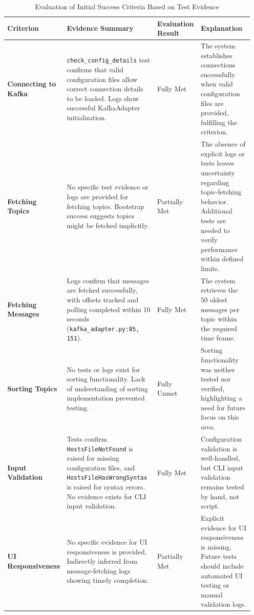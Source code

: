 \documentclass[10pt , a4paper]{report}
\begin{document}
\begin{table}[h!tbp]
\centering
\renewcommand{\arraystretch}{1.3}
\begin{adjustbox}{max width=\textwidth}
\begin{tabular}{|p{3.5cm}|p{5.5cm}|p{3.5cm}|p{3.5cm}|}
\hline
\textbf{Criterion} & \textbf{Evidence Summary} & \textbf{Evaluation Result} & \textbf{Explanation} \\ \hline

\textbf{Connecting to Kafka} & 
\texttt{check\_config\_details} test  confirms that valid configuration files allow correct connection details to be loaded. Logs show successful KafkaAdapter initialization. & 
Fully Met & 
The system establishes connections successfully when valid configuration files are provided, fulfilling the criterion. \\ \hline

\textbf{Fetching Topics} & 
No specific test evidence or logs are provided for fetching topics. Bootstrap success suggests topics might be fetched implicitly. & 
Partially Met & 
The absence of explicit logs or tests leaves uncertainty regarding topic-fetching behavior. Additional tests are needed to verify performance within defined limits. \\ \hline

\textbf{Fetching Messages} & 
Logs confirm that messages are fetched successfully, with offsets tracked and polling completed within 10 seconds (\texttt{kafka\_adapter.py:85, 151}). & 
Fully Met & 
The system retrieves the 50 oldest messages per topic within the required time frame. \\ \hline

\textbf{Sorting Topics} & 
No tests or logs exist for sorting functionality. Lack of understanding of sorting implementation prevented testing. & 
Fully Unmet & 
Sorting functionality was neither tested nor verified, highlighting a need for future focus on this area. \\ \hline

\textbf{Input Validation} & 
Tests confirm \texttt{HostsFileNotFound} is raised for missing configuration files, and \texttt{HostsFileHasWrongSyntax} is raised for syntax errors. No evidence exists for CLI input validation. & 
Fully Met & 
Configuration validation is well-handled, but CLI input validation remains tested by hand, not script. \\ \hline

\textbf{UI Responsiveness} & 
No specific evidence for UI responsiveness is provided. Indirectly inferred from message-fetching logs showing timely completion. & 
Partially Met & 
Explicit evidence for UI responsiveness is missing. Future tests should include automated UI testing or manual validation logs. \\ \hline

\end{tabular}
\end{adjustbox}
\caption{Evaluation of Initial Success Criteria Based on Test Evidence}
\label{tab:success-evaluation}
\end{table}
\end{document}
